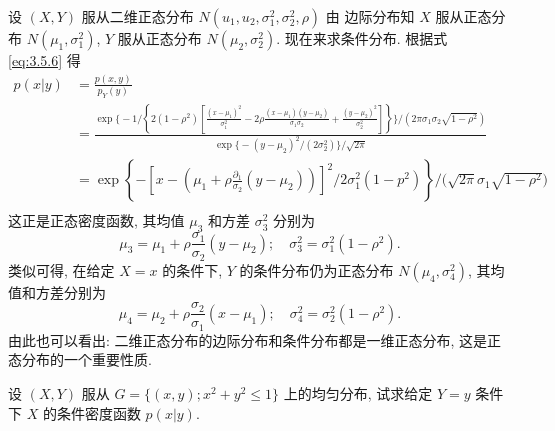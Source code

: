 	\begin{example}\label{exam:3.5.4}
		设 $(X,Y)$ 服从二维正态分布 $N(u_1,u_2,\sigma_1^2,\sigma_2^2,\rho)$ 由
		边际分布知 $X$ 服从正态分布 $N(\mu_1,\sigma_1^2)$, $Y$ 服从正态分布 $N(\mu_2,\sigma_2^2)$. 现在来求条件分布.
		根据式~ \eqref{eq:3.5.6} 得
		\begin{align*}
			 p(x|y)&=\frac{p(x,y)}{p_Y(y)}	\\
			&=\frac{\exp\bigg\{-1/\left\{2(1-\rho^2)\left[
			\frac{(x-\mu_1)^2}{\sigma_1^2}-2\rho\frac{(x-\mu_1)(y-\mu_2)}{\sigma_1\sigma_2}
			+\frac{(y-\mu_2)^2}{\sigma_2^2}\right]\right\}\bigg\}/(2\pi\sigma_1\sigma_2\sqrt{1-\rho^2})}
			{\exp\big\{-(y-\mu_2)^2/(2\sigma_2^2)\big\}/\sqrt{2\pi}}	\\
			&=\exp \left\{-\left[x-\left(\mu_{1}+\rho \frac{\partial_{1}}{\sigma_{2}}\left(y-\mu_{2}\right)\right)\right]^{2}/{2 \sigma_{1}^{2}\left(1-p^{2}\right)}\right\}	/\Big(\sqrt{2 \pi} \sigma_{1} \sqrt{1-\rho^{2}}\Big) \\
		\end{align*}
		这正是正态密度函数, 其均值 $\mu_3$ 和方差 $\sigma_3^2$ 分别为
		\[
		 	\mu_{3}=\mu_{1}+\rho \frac{\sigma_{1}}{\sigma_{2}}\left(y-\mu_{2}\right) ;
		 	 \quad \sigma_{3}^{2}=\sigma_{1}^{2}\left(1-\rho^{2}\right).
		\]
		类似可得, 在给定 $X=x$ 的条件下, $Y$ 的条件分布仍为正态分布 $N(\mu_4,\sigma_4^2)$, 其均值和方差分别为
		\[
			\mu_{4}=\mu_{2}+\rho \frac{\sigma_{2}}{\sigma_{1}}\left(x-\mu_{1}\right) ;
			 \quad \sigma_{4}^{2}=\sigma_{2}^{2}\left(1-\rho^{2}\right).
		\]
		由此也可以看出: 二维正态分布的边际分布和条件分布都是一维正态分布, 这是正态分布的一个重要性质.
	\end{example}
	\begin{example}\label{exam:3.5.5}
		设 $(X,Y)$ 服从 $G=\{(x,y);x^2+y^2\leq 1\}$ 上的均匀分布, 试求给定 $Y=y$ 条件下 $X$ 的条件密度函数 $p(x|y)$.
	\end{example}
